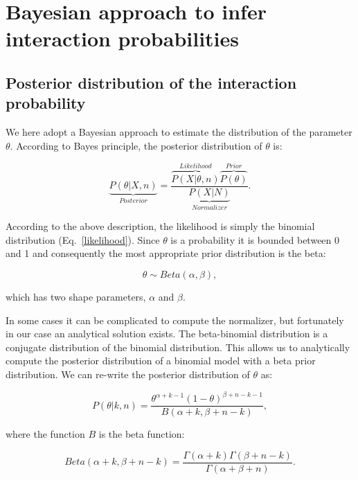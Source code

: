 \documentclass[12pt]{article}
\begin{document}
\section*{Bayesian approach to infer interaction probabilities}

    \subsection*{Posterior distribution of the interaction probability}

      We here adopt a Bayesian approach to estimate the distribution of the parameter $\theta$. According to Bayes principle, the posterior distribution of $\theta$ is:

      \begin{equation}
        \underbrace{P(\theta|X,n)}_{Posterior} = \frac{\overbrace{P(X|\theta,n)}^{Likelihood}\overbrace{P(\theta)}^{Prior}}{\underbrace{P(X|N)}_{Normalizer}} .
        \label{posterior}
      \end{equation}

      According to the above description, the likelihood is simply the binomial distribution (Eq.~\ref{likelihood}). Since $\theta$ is a probability it is bounded between 0 and 1 and consequently the most appropriate prior distribution is the beta:

      \begin{equation}
        \theta \sim Beta(\alpha,\beta) , \label{prior}
      \end{equation}

      \noindent which has two shape parameters, $\alpha$ and $\beta$. 

     In some cases it can be complicated to compute the normalizer, but fortunately in our case an analytical solution exists. The beta-binomial distribution is a conjugate distribution of the binomial distribution. This allows us to analytically compute the posterior distribution of a binomial model with a beta prior distribution. We can re-write the posterior distribution of $\theta$ as:

      \begin{equation}
        P(\theta|k,n) = \frac{\theta^{\alpha+k-1}(1-\theta)^{\beta+n-k-1}}{B(\alpha+k,\beta+n-k)} , \label{posterior}
      \end{equation}

      \noindent where the function $B$ is the beta function:

      \begin{equation}
        Beta(\alpha+k,\beta+n-k) = \frac{\Gamma(\alpha+k)\Gamma(\beta+n-k)}{\Gamma(\alpha+\beta+n)} . \label{betafunction}
      \end{equation}
\end{document}
